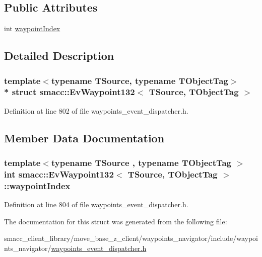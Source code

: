 \subsection*{Public Attributes}
\begin{DoxyCompactItemize}
\item 
int \hyperlink{structsmacc_1_1EvWaypoint132_a30478b2b05baeeb33098a7d64f81eef3}{waypoint\+Index}
\end{DoxyCompactItemize}


\subsection{Detailed Description}
\subsubsection*{template$<$typename T\+Source, typename T\+Object\+Tag$>$\\*
struct smacc\+::\+Ev\+Waypoint132$<$ T\+Source, T\+Object\+Tag $>$}



Definition at line 802 of file waypoints\+\_\+event\+\_\+dispatcher.\+h.



\subsection{Member Data Documentation}
\subsubsection[{\texorpdfstring{waypoint\+Index}{waypointIndex}}]{\setlength{\rightskip}{0pt plus 5cm}template$<$typename T\+Source , typename T\+Object\+Tag $>$ int {\bf smacc\+::\+Ev\+Waypoint132}$<$ T\+Source, T\+Object\+Tag $>$\+::waypoint\+Index}\hypertarget{structsmacc_1_1EvWaypoint132_a30478b2b05baeeb33098a7d64f81eef3}{}\label{structsmacc_1_1EvWaypoint132_a30478b2b05baeeb33098a7d64f81eef3}


Definition at line 804 of file waypoints\+\_\+event\+\_\+dispatcher.\+h.



The documentation for this struct was generated from the following file\+:\begin{DoxyCompactItemize}
\item 
smacc\+\_\+client\+\_\+library/move\+\_\+base\+\_\+z\+\_\+client/waypoints\+\_\+navigator/include/waypoints\+\_\+navigator/\hyperlink{waypoints__event__dispatcher_8h}{waypoints\+\_\+event\+\_\+dispatcher.\+h}\end{DoxyCompactItemize}
